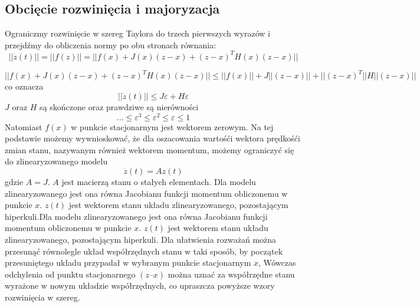 \documentclass{article}
\begin{document}
	\subsection{Obcięcie rozwinięcia i majoryzacja}
		Ograniczmy rozwinięcie w szereg Taylora do trzech pierwszych wyrazów i przejdźmy do
		obliczenia normy po obu stronach równania:
		\begin{equation}
			||\dot{z}(t)||=||f(z)|| = ||f(x) + J(x)(z-x) + (z-x)^TH(x)(z-x)||
		\end{equation}

		\begin{equation}
			||f(x) + J(x)(z-x) + (z-x)^TH(x)(z-x)|| \leq ||f(x)|| + J||(z-x)|| + ||(z-x)^T||H||(z-x)||
		\end{equation}
		co oznacza 
		\begin{equation}
			||\dot{z}(t)|| \leq J \varepsilon + H \varepsilon 
		\end{equation}
		$J$ oraz $H$ są skończone oraz prawdziwe są nierówności
		\begin{equation}
			... \leq \varepsilon^3 \leq \varepsilon^2 \leq \varepsilon \leq 1
		\end{equation}
		Natomiast $f(x)$ w punkcie stacjonarnym jest wektorem zerowym. Na tej podstawie możemy
		wywnioskować, że dla oszacowania wartośći wektora prędkośći zmian stanu, nazywanym również wektorem momentum, możemy ograniczyć się do zlinearyzowanego modelu
		\begin{equation}
			\dot{z}(t)=Az(t)
		\end{equation}
		gdzie $A=J$.
		$A$ jest macierzą stanu o stałych elementach. Dla modelu zlinearyzowanego jest ona równa
		Jacobianu funkcji momentum obliczonemu w punkcie $x$.
		$z(t)$ jest wektorem stanu układu zlinearyzowanego, pozostającym hiperkuli.Dla modelu zlinearyzowanego jest ona równa
		Jacobianu funkcji momentum obliczonemu w punkcie $x$.
		$z(t)$ jest wektorem stanu układu zlinearyzowanego, pozostającym hiperkuli.
		Dla ułatwienia rozważań można przesunąć równolegle układ współrzędnych stanu w
		taki sposób, by początek przesuniętego układu przypadał w wybranym punkcie
		stacjonarnym $x$, Wówczas odchylenia od punktu stacjonarnego $(z – x)$ można uznać za
		współrzędne stanu wyrażone w nowym układzie współrzędnych, co upraszcza powyższe
		wzory rozwinięcia w szereg.
		
\end{document}
